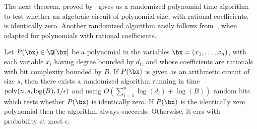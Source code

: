 The next theorem, proved by~\cite[Theorem 4.10]{AB03} gives us a randomized polynomial time
algorithm to test whether an algebraic circuit of polynomial size, with rational
coefficients, is identically zero. Another randomized algorithm easily follows
from~\cite[Lemma 2]{S79}, when adapted for polynomials with rational coefficients.

\begin{theorem}\label{thm:PIT-BPP}
	Let $P(\bx) \in \Q[\bx]$ be a polynomial in the variables $\bx = (x_1, \ldots, x_n)$, with
	each variable $x_i$ having degree bounded by $d_i$, and whose coefficients are rationals with
	bit complexity bounded by $B$. If $P(\bx)$ is given as an arithmetic circuit of size $s$, then
	there exists a randomized algorithm running in time ${\rm poly}(n, s, \log(B), 1/\epsilon)$
	and using $O\left(\sum_{i=1}^n \log(d_i) + \log(B) \right)$ random bits which tests whether $P(\bx)$ is identically zero.
	If $P(\bx)$ is the identically zero polynomial then the algorithm always succeeds.
	Otherwise, it errs with probability at most $\epsilon$.
\end{theorem}
